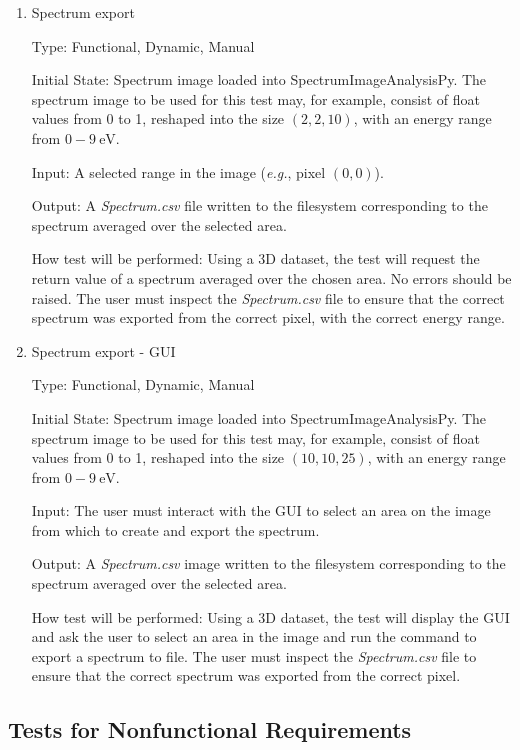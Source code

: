 \documentclass[12pt, titlepage]{article}
\newcommand{\progname}{SpectrumImageAnalysisPy}
\begin{document}
\begin{enumerate}
\item{Spectrum export}
\label{TFR:SpecExport}

Type: Functional, Dynamic, Manual

Initial State: Spectrum image loaded into \progname{}. The spectrum image to be
used for this test may, for example, consist of float values from 0 to 1,
reshaped into the size $(2,2,10)$, with an energy range from $0-9\
\si{\electronvolt}$.

Input: A selected range in the image (\textit{e.g.}, pixel $(0,0)$).

Output: A \textit{Spectrum.csv} file written to the filesystem corresponding to
the spectrum averaged over the selected area.

How test will be performed: Using a 3D dataset, the test will request the return
value of a spectrum averaged over the chosen area. No errors should be raised.
The user must inspect the \textit{Spectrum.csv} file to ensure that the correct
spectrum was exported from the correct pixel, with the correct energy range.

\item{Spectrum export - GUI}
\label{TFR:SpecExportGUI}

Type: Functional, Dynamic, Manual

Initial State: Spectrum image loaded into \progname{}. The spectrum image to be
used for this test may, for example, consist of float values from 0 to 1,
reshaped into the size $(10,10,25)$, with an energy range from $0-9\
\si{\electronvolt}$.

Input: The user must interact with the GUI to select an area on the image from
which to create and export the spectrum.

Output: A \textit{Spectrum.csv} image written to the filesystem corresponding to
the spectrum averaged over the selected area.

How test will be performed: Using a 3D dataset, the test will display the GUI
and ask the user to select an area in the image and run the command to export a
spectrum to file. The user must inspect the \textit{Spectrum.csv} file to ensure
that the correct spectrum was exported from the correct pixel.\\

\end{enumerate}


\subsection{Tests for Nonfunctional Requirements}
\label{subsec:NonfuncReqTest}
\end{document}
